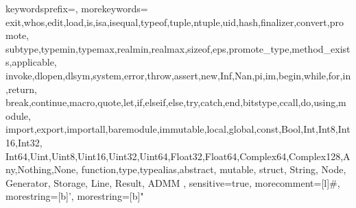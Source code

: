 


\usepackage{listings}
\renewcommand{\lstlistingname}{Code Snippet}
\renewcommand{\lstlistlistingname}{List of \lstlistingname s}
\usepackage{inconsolata} %
\usepackage[usenames,dvipsnames]{color} %


{
  keywordsprefix=\@,
  morekeywords={
    exit,whos,edit,load,is,isa,isequal,typeof,tuple,ntuple,uid,hash,finalizer,convert,promote,
    subtype,typemin,typemax,realmin,realmax,sizeof,eps,promote_type,method_exists,applicable,
    invoke,dlopen,dlsym,system,error,throw,assert,new,Inf,Nan,pi,im,begin,while,for,in,return,
    break,continue,macro,quote,let,if,elseif,else,try,catch,end,bitstype,ccall,do,using,module,
    import,export,importall,baremodule,immutable,local,global,const,Bool,Int,Int8,Int16,Int32,
    Int64,Uint,Uint8,Uint16,Uint32,Uint64,Float32,Float64,Complex64,Complex128,Any,Nothing,None,
    function,type,typealias,abstract, mutable, struct, String, Node, Generator, Storage, Line, Result, ADMM
  },
  sensitive=true,
  morecomment=[l]{\#},
  morestring=[b]',
  morestring=[b]" 
}

\usepackage{graphicx}
\graphicspath{ {./images/} }

\usepackage{url}



\makeatletter
\def\chfootnote{\xdef\@thefnmark{}\@footnotetext}
